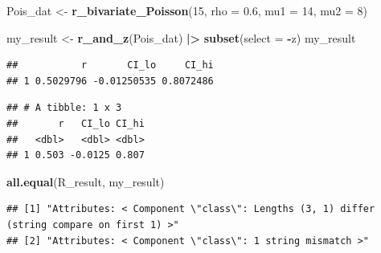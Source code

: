 \documentclass[
]{book}
\newenvironment{Shaded}{\begin{snugshade}}{\end{snugshade}}
\newcommand{\AttributeTok}[1]{\textcolor[rgb]{0.13,0.29,0.53}{#1}}
\newcommand{\DecValTok}[1]{\textcolor[rgb]{0.00,0.00,0.81}{#1}}
\newcommand{\FloatTok}[1]{\textcolor[rgb]{0.00,0.00,0.81}{#1}}
\newcommand{\FunctionTok}[1]{\textcolor[rgb]{0.13,0.29,0.53}{\textbf{#1}}}
\newcommand{\NormalTok}[1]{#1}
\newcommand{\OtherTok}[1]{\textcolor[rgb]{0.56,0.35,0.01}{#1}}
\newcommand{\SpecialCharTok}[1]{\textcolor[rgb]{0.81,0.36,0.00}{\textbf{#1}}}
\newcommand{\StringTok}[1]{\textcolor[rgb]{0.31,0.60,0.02}{#1}}
\begin{document}
\begin{Shaded}
\begin{Highlighting}[]
\NormalTok{Pois\_dat }\OtherTok{\textless{}{-}} \FunctionTok{r\_bivariate\_Poisson}\NormalTok{(}\DecValTok{15}\NormalTok{, }\AttributeTok{rho =} \FloatTok{0.6}\NormalTok{, }\AttributeTok{mu1 =} \DecValTok{14}\NormalTok{, }\AttributeTok{mu2 =} \DecValTok{8}\NormalTok{)}

\NormalTok{my\_result }\OtherTok{\textless{}{-}} \FunctionTok{r\_and\_z}\NormalTok{(Pois\_dat) }\SpecialCharTok{|\textgreater{}} \FunctionTok{subset}\NormalTok{(}\AttributeTok{select =} \SpecialCharTok{{-}}\NormalTok{z)}
\NormalTok{my\_result}
\end{Highlighting}
\end{Shaded}

\begin{verbatim}
##           r       CI_lo     CI_hi
## 1 0.5029796 -0.01250535 0.8072486
\end{verbatim}

\begin{Shaded}
\end{Shaded}

\begin{verbatim}
## # A tibble: 1 x 3
##       r   CI_lo CI_hi
##   <dbl>   <dbl> <dbl>
## 1 0.503 -0.0125 0.807
\end{verbatim}

\begin{Shaded}
\begin{Highlighting}[]
\FunctionTok{all.equal}\NormalTok{(R\_result, my\_result)}
\end{Highlighting}
\end{Shaded}

\begin{verbatim}
## [1] "Attributes: < Component \"class\": Lengths (3, 1) differ (string compare on first 1) >"
## [2] "Attributes: < Component \"class\": 1 string mismatch >"
\end{verbatim}
\end{document}
